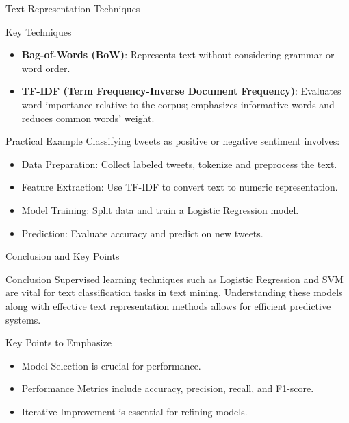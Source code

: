 \documentclass[aspectratio=169]{beamer}
\begin{document}
\begin{frame}[fragile]{Text Representation Techniques}
    \begin{block}{Key Techniques}
        \begin{itemize}
            \item \textbf{Bag-of-Words (BoW)}: Represents text without considering grammar or word order.
            \item \textbf{TF-IDF (Term Frequency-Inverse Document Frequency)}: Evaluates word importance relative to the corpus; emphasizes informative words and reduces common words' weight.
        \end{itemize}
    \end{block}
    
    \begin{block}{Practical Example}
        Classifying tweets as positive or negative sentiment involves:
        \begin{itemize}
            \item Data Preparation: Collect labeled tweets, tokenize and preprocess the text.
            \item Feature Extraction: Use TF-IDF to convert text to numeric representation.
            \item Model Training: Split data and train a Logistic Regression model.
            \item Prediction: Evaluate accuracy and predict on new tweets.
        \end{itemize}
    \end{block}
\end{frame}

\begin{frame}[fragile]{Conclusion and Key Points}
    \begin{block}{Conclusion}
        Supervised learning techniques such as Logistic Regression and SVM are vital for text classification tasks in text mining. 
        Understanding these models along with effective text representation methods allows for efficient predictive systems.
    \end{block}
    
    \begin{block}{Key Points to Emphasize}
        \begin{itemize}
            \item Model Selection is crucial for performance.
            \item Performance Metrics include accuracy, precision, recall, and F1-score.
            \item Iterative Improvement is essential for refining models.
        \end{itemize}
    \end{block}
\end{frame}
\end{document}
